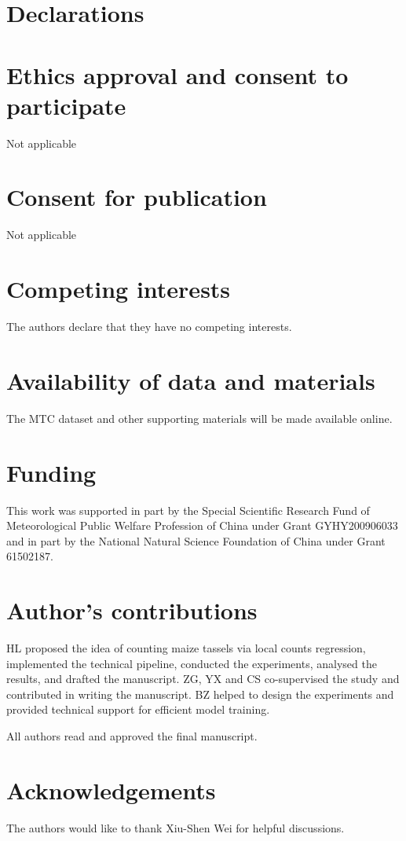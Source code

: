 \documentclass[twocolumn]{bmcart}%
\begin{document}
%
%
%
%
%

\begin{backmatter}

\section*{Declarations}

\section*{Ethics approval and consent to participate}
Not applicable

\section*{Consent for publication}
Not applicable

\section*{Competing interests}
The authors declare that they have no competing interests.

\section*{Availability of data and materials}
The MTC dataset and other supporting materials will be made available online.



\section*{Funding}
This work was supported in part by the Special Scientific Research Fund of Meteorological Public Welfare Profession of China under Grant GYHY200906033 and in part by the National Natural Science Foundation of China under Grant 61502187.

\section*{Author's contributions}
HL proposed the idea of counting maize tassels via local counts regression, implemented the technical pipeline, conducted the experiments, analysed the results, and drafted the manuscript. ZG, YX and CS co-supervised the study and contributed in writing the manuscript.
BZ helped to design the experiments and provided technical support
 for efficient model training.

 All authors read and approved the final manuscript.




\section*{Acknowledgements}
The authors would like to thank Xiu-Shen Wei for helpful discussions.
%
%
%
%
%
%
%
%
%
%
%
%
%
%

%
%
%
%
%
%

%
%
%
%

%
%
%
%
%

%


\end{backmatter}
\end{document}

